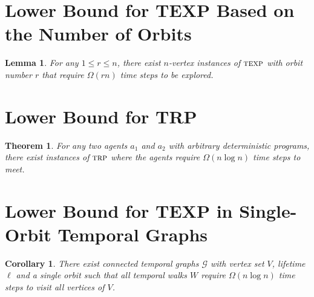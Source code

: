 \documentclass[10pt,a4paper]{article}
\newtheorem{theorem}{Theorem}[section]
\newtheorem{lemma}{Lemma}[section]
\newtheorem{corollary}{Corollary}[section]
\newcommand{\trp}{\textsc{trp}}
\newcommand{\texp}{\textsc{texp}}
\begin{document}
{\setcounter{theorem}{14}
\section{Lower Bound for TEXP Based on the Number of Orbits}
\begin{lemma}
        For any $1\le r\le n$, there exist $n$-vertex instances of $\texp$ with
        orbit number $r$ that require $\Omega(rn)$ time steps to be explored. 
    \end{lemma}
\proornlowerbound

\section{Lower Bound for TRP}
\begin{theorem}
    For any two agents $a_1$ and $a_2$ with arbitrary deterministic programs,
    there exist instances of $\trp$ where the agents
    require $\Omega(n \log n)$ time steps to meet.
\end{theorem}
\proofrendezvouslb

\section{Lower Bound for TEXP in Single-Orbit Temporal Graphs}
\begin{corollary} There exist connected temporal graphs
    $\mathcal{G}$ with vertex set $V$, lifetime $\ell$ and a single orbit such
    that all temporal walks $W$ require $\Omega(n \log n)$ time steps to visit
    all vertices of $V$.
\end{corollary}
\proofexplorationlb
}
\end{document}
